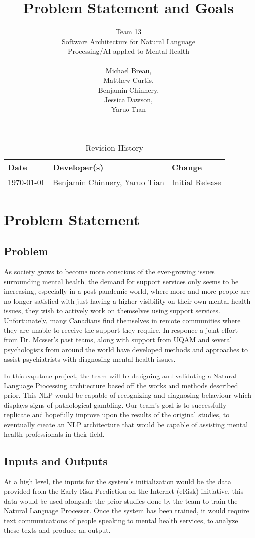 \documentclass{article}
\title{Problem Statement and Goals\\}
\author{Team 13 \\Software Architecture for Natural Language
\\ Processing/AI applied to Mental Health \\
\\Michael Breau, \\Matthew Curtis, \\Benjamin Chinnery, \\Jessica Dawson, \\Yaruo Tian}
\begin{document}
\maketitle

\begin{table}[hp]
\caption{Revision History} \label{TblRevisionHistory}
\begin{tabularx}{\textwidth}{llX}
\toprule
\textbf{Date} & \textbf{Developer(s)} & \textbf{Change}\\
\midrule
\today &  Benjamin Chinnery, Yaruo Tian & Initial Release\\
\bottomrule
\end{tabularx}
\end{table}

\section{Problem Statement}

\subsection{Problem}
As society grows to become more conscious of the ever-growing issues surrounding mental health, the demand for support services only seems to be increasing, especially in a post pandemic world, where more and more people are no longer satisfied with just having a higher visibility on their own mental health issues, they wish to actively work on themselves using support services. Unfortunately, many Canadians find themselves in remote communities where they are unable to receive the support they require. In responce a joint effort from Dr. Mosser's past teams, along with support from UQAM and several psychologists from around the world have developed methods and approaches to assist psychiatrists with diagnosing mental health issues.

In this capstone project, the team will be designing and validating a Natural Language Processing architecture based off the works and methods described prior. This NLP would be capable of recognizing and diagnosing behaviour which displays signs of pathological gambling. Our team's goal is to successfully replicate and hopefully improve upon the results of the original studies, to eventually create an NLP architecture that would be capable of assisting mental health professionals in their field.

\subsection{Inputs and Outputs}
At a high level, the inputs for the system's initialization would be the data provided from the Early Risk Prediction on the Internet (eRisk) initiative, this data would be used alongside the prior studies done by the team to train the Natural Language Processor. Once the system has been trained, it would require text communications of people speaking to mental health services, to analyze these texts and produce an output.
\end{document}
